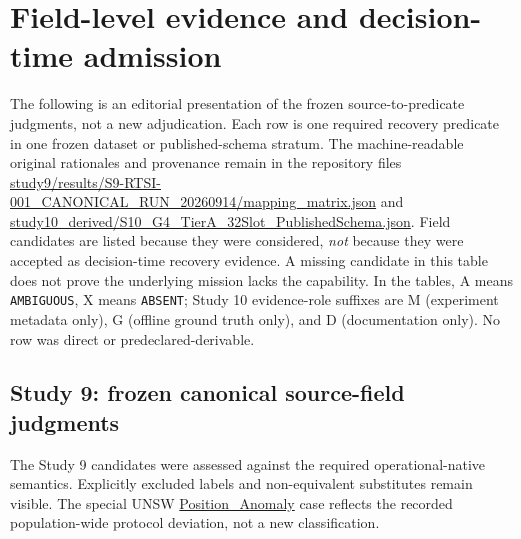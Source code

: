 \section{Field-level evidence and decision-time admission}
\label{app:fieldledger}
The following is an editorial presentation of the frozen source-to-predicate judgments, not a new adjudication. Each row is one required recovery predicate in one frozen dataset or published-schema stratum. The machine-readable original rationales and provenance remain in the repository files \url{study9/results/S9-RTSI-001_CANONICAL_RUN_20260914/mapping_matrix.json} and \url{study10_derived/S10_G4_TierA_32Slot_PublishedSchema.json}. Field candidates are listed because they were considered, \emph{not} because they were accepted as decision-time recovery evidence. A missing candidate in this table does not prove the underlying mission lacks the capability. In the tables, A means \texttt{AMBIGUOUS}, X means \texttt{ABSENT}; Study 10 evidence-role suffixes are M (experiment metadata only), G (offline ground truth only), and D (documentation only). No row was direct or predeclared-derivable.

\subsection{Study 9: frozen canonical source-field judgments}
The Study 9 candidates were assessed against the required operational-native semantics. Explicitly excluded labels and non-equivalent substitutes remain visible. The special UNSW \url{Position_Anomaly} case reflects the recorded population-wide protocol deviation, not a new classification.

